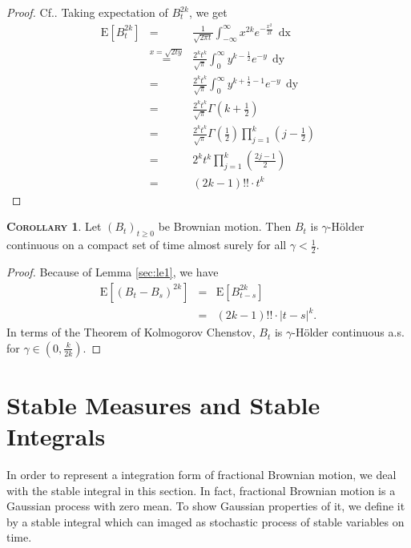 \documentclass[a4paper, twoside, 11pt]{article}
\theoremstyle{definition}
\newtheorem{corollary}[definition]{\scshape Corollary}
\begin{document}
\begin{proof}
  Cf.\cite{shilling}. Taking expectation of $B_t^{2k}$, we get
  \begin{eqnarray*}
	\mathrm{E}[B_t^{2k}] &=& \frac{1}{\sqrt{2\pi t}}\int_{-\infty}^{\infty} x^{2k} e^{-\frac{x^2}{2t}}\,\mathop{dx}\\
	&\overset{x=\sqrt{2ty}}{=}& \frac{2^kt^k}{\sqrt{\pi}} \int_0^{\infty} y^{k-\frac{1}{2}} e^{-y}\,\mathop{dy}\\
	&=& \frac{2^kt^k}{\sqrt{\pi}} \int_0^{\infty} y^{k+\frac{1}{2}-1} e^{-y}\,\mathop{dy}\\
	&=& \frac{2^kt^k}{\sqrt{\pi}} \Gamma(k + \frac{1}{2})\\
	&=& \frac{2^kt^k}{\sqrt{\pi}} \Gamma(\frac{1}{2})\prod_{j=1}^k(j-\frac{1}{2}) \\
	&=& 2^k t^k\prod_{j=1}^k(\frac{2j-1}{2}) \\
	&=& (2k - 1)!!\cdot t^k
  \end{eqnarray*}
\end{proof}

\begin{corollary}
  Let $(B_t)_{t\ge 0}$ be Brownian motion. Then $B_t$ is $\gamma$-H\"older continuous on a compact set of time almost surely for all $\gamma < \frac{1}{2}$.
\end{corollary}

\begin{proof}
  Because of Lemma \ref{sec:le1}, we have
  \begin{eqnarray*}
	\mathrm{E}[(B_t-B_s)^{2k}] &=& \mathrm{E}[B_{t-s}^{2k}]\\
	&=& (2k - 1)!! \cdot |t-s|^{k}.
  \end{eqnarray*}
  In terms of the Theorem of Kolmogorov Chenstov, $B_t$ is $\gamma$-H\"older continuous a.s. for $\gamma \in (0, \frac{k}{2k})$.
\end{proof}

\newpage

\section{Stable Measures and Stable Integrals}
In order to represent a integration form of fractional Brownian motion, we deal with the stable integral in this section. In fact, fractional Brownian motion is a Gaussian process with zero mean. To show Gaussian properties of it, we define it by a 
stable integral which can imaged as stochastic process of stable variables on time.
\end{document}
